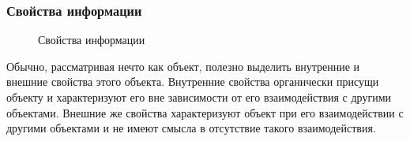\begin{frame}
    \frametitle{Свойства информации}
    \begin{figure}
        \begin{center}
        \end{center}
        \caption{Свойства информации}\label{pict:iproperties}
    \end{figure} 
\end{frame}


Обычно, рассматривая нечто как объект, полезно выделить внутренние и внешние свойства этого объекта. Внутренние свойства органически присущи объекту и характеризуют его вне зависимости от его взаимодействия с другими объектами. Внешние же свойства характеризуют объект при его взаимодействии с другими объектами и не имеют смысла в отсутствие такого взаимодействия.

